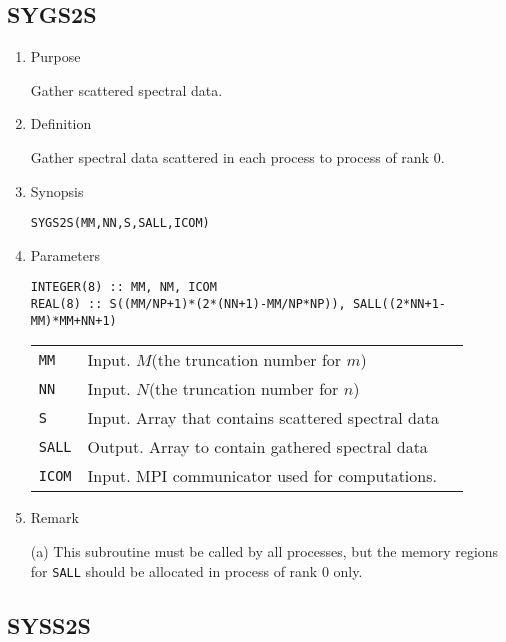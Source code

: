 \documentclass[a4paper]{scrartcl}
\begin{document}

\subsection{SYGS2S}

\begin{enumerate}

\item Purpose 

Gather scattered spectral data.  

\item Definition

Gather spectral data scattered in each process to process of rank 0.  

\item Synopsis 

\texttt{SYGS2S(MM,NN,S,SALL,ICOM)}
  
\item Parameters

\begin{verbatim}        
INTEGER(8) :: MM, NM, ICOM
REAL(8) :: S((MM/NP+1)*(2*(NN+1)-MM/NP*NP)), SALL((2*NN+1-MM)*MM+NN+1)
\end{verbatim}      

\begin{tabular}{lll}
\texttt{MM} & Input. $M$(the truncation number for $m$)\\
\texttt{NN} & Input. $N$(the truncation number for $n$)\\
\texttt{S} & Input. Array that contains scattered spectral data\\
\texttt{SALL} &  Output. Array to contain gathered spectral data\\
\texttt{ICOM} & Input. MPI communicator used for computations.
\end{tabular}

\item Remark

(a) This subroutine must be called by all processes, but
  the memory regions for \texttt{SALL} should be allocated in process
  of rank 0 only.

\end{enumerate}



\subsection{SYSS2S}
\end{document}

